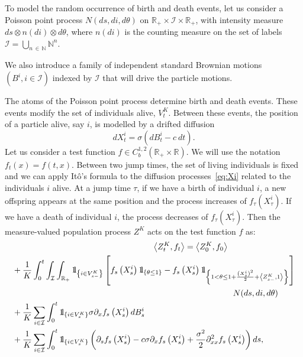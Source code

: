 \documentclass[10pt]{amsart}
\theoremstyle{definition}\newtheorem{defi}[theo]{Definition}\newtheorem{rema}[theo]{Remark}\newtheorem{exam}[theo]{Example}\newtheorem{exem}[theo]{Example}\newtheorem{nota}[theo]{Notation}
\newcommand{\Io}{\mathcal{I}}
\newcommand*\N{\mathbb{N}}
\newcommand*\R{\mathbb{R}}
\newcommand*\ind{{\mathchoice {\rm 1\mskip-4mu l} {\rm 1\mskip-4mu l} {\rm 1\mskip-4.5mu l} {\rm 1\mskip-5mu l}}}
\begin{document}
To model the random occurrence of birth and death events, let us consider a Poisson point process $N(ds,di,d\theta)$ on $\R_+\times \Io\times \R_+$, with intensity measure $ds\otimes n(di)\otimes d\theta$, where $n(di)$ is the counting measure on the set of labels $\Io=\bigcup_{n\,\in\,\N}\N^n$.


We also introduce a family of independent standard Brownian motions $(B^i, i\in \Io)$ indexed by $\Io$ that will drive the particle motions.

The atoms of the Poisson point process determine birth and death events. These events modify the set of individuals alive, $V^K_t$. Between these events, the position of a particle alive, say $i$, is modelled by a drifted diffusion
\begin{equation}\label{eq:Xi}
dX^i_t=\sigma(dB^i_t-c\ dt).\end{equation}
Let us consider a test function $f \in C^{1,2}_b(\R_+\times \R)$. We will use the notation $f_t(x)=f(t,x)$. Between two jump times, the set of living individuals is fixed and we can apply It\^o's formula to the diffusion processes~\eqref{eq:Xi} related to the individuals $i$ alive. At a jump time $\tau$, if we have a birth of individual $i$, a new offspring appears at the same position and the process increases of $f_\tau(X^i_\tau)$. If we have a death of individual $i$, the process decreases of $f_\tau(X^i_\tau)$. Then the measure-valued population process $Z^K$ acts on the test function $f$ as:
\begin{multline}\label{eq:sde1}
\lefteqn{\left\langle Z^{K}_t,f_t\right\rangle = \left\langle Z^{K}_0,f_0\right\rangle}\\
\begin{aligned}
&+ \frac{1}{K}\int_0^t \int_{\Io}\int_{\R_+}\ind_{\left\{i \in V^K_{s-}\right\}} \left[f_{s}\left(X^i_{s}\right)\ind_{\left\{\theta \leq 1\right\}} - f_{s}\left(X^i_{s}\right) \ind_{\left\{1 < \theta \leq 1+\frac{\left(X^i_s\right)^2}{2}+\left\langle Z_{s-}^{K},1\right\rangle\right\}} \right]\\
&\mkern480mu N(ds, di, d\theta) \\
&+ \frac{1}{K}\sum_{i \in \Io}\int_0^t \ind_{\left\{i \in V^K_s\right\}} \sigma \partial_x f_s\left(X^i_s\right) dB^i_s \\
&+ \frac{1}{K} \sum_{i \in \Io}\int_0^t \ind_{\left\{i \in V^K_s\right\}} \left(\partial_s f_s\left(X^i_s\right) -c\sigma \partial_x f_s\left(X^i_s\right)+\frac{\sigma^2}{2} \partial^2_{xx}f_s\left(X^i_s\right) \right) ds,
\end{aligned}
\end{multline}
\end{document}
